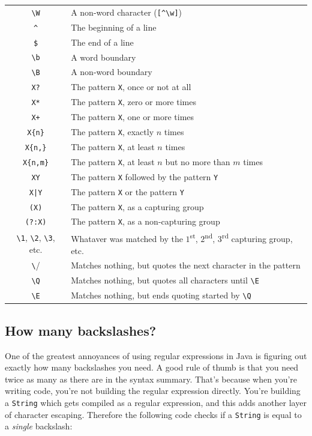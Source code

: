 \documentclass[a4paper,12pt]{article}
\begin{document}
\begin{tabular*}{\textwidth}{|c|l|}
\lstinline/\W/ & A non-word character (\lstinline/[^\w]/) \\
\lstinline/^/ & The beginning of a line \\
\lstinline/$/ & The end of a line \\
\lstinline/\b/ & A word boundary \\
\lstinline/\B/ & A non-word boundary \\
\lstinline/X?/ & The pattern \lstinline/X/, once or not at all \\
\lstinline/X*/ & The pattern \lstinline/X/, zero or more times \\
\lstinline/X+/ & The pattern \lstinline/X/, one or more times \\
\lstinline/X{n}/ & The pattern \lstinline/X/, exactly $n$ times \\
\lstinline/X{n,}/ & The pattern \lstinline/X/, at least $n$ times \\
\lstinline/X{n,m}/ & The pattern \lstinline/X/, at least $n$ but no more than $m$ times \\
\lstinline/XY/ & The pattern \lstinline/X/ followed by the pattern \lstinline/Y/ \\
\lstinline/X|Y/ & The pattern \lstinline/X/ or the pattern \lstinline/Y/ \\
\lstinline/(X)/ & The pattern \lstinline/X/, as a capturing group \\
\lstinline/(?:X)/ & The pattern \lstinline/X/, as a non-capturing group \\
\lstinline/\1/, \lstinline/\2/, \lstinline/\3/, etc. & Whataver was matched by the $1$\textsuperscript{st}, $2$\textsuperscript{nd}, $3$\textsuperscript{rd} capturing group, etc. \\
\lstinline/\/ & Matches nothing, but quotes the next character in the pattern \\
\lstinline/\Q/ & Matches nothing, but quotes all characters until \lstinline/\E/ \\
\lstinline/\E/ & Matches nothing, but ends quoting started by \lstinline/\Q/ \\
\hline
\end{tabular*}
\pagebreak

\subsection{How many backslashes?}

One of the greatest annoyances of using regular expressions in Java is figuring out exactly how many backslashes you need. A good rule of thumb is that you need twice as many as there are in the syntax summary. That's because when you're writing code, you're not building the regular expression directly. You're building a \lstinline/String/ which gets compiled as a regular expression, and this adds another layer of character escaping. Therefore the following code checks if a \lstinline/String/ is equal to a {\em single} backslash:
\end{document}
